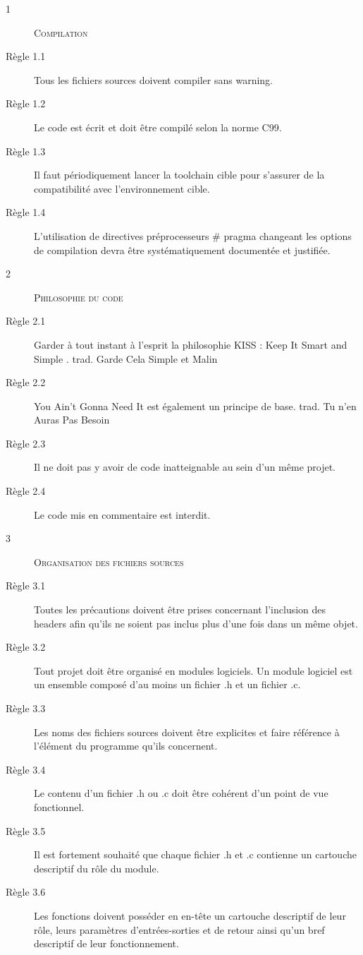 \begin{description}
\item[1] \textsc{Compilation}
\item[Règle 1.1] Tous les fichiers sources doivent compiler sans warning.
\item[Règle 1.2] Le code est écrit et doit être compilé selon la norme C99.
\item[Règle 1.3] Il faut périodiquement lancer la toolchain cible pour s’assurer de la compatibilité avec l’environnement cible.
\item[Règle 1.4] L’utilisation de directives préprocesseurs \# pragma changeant les options de compilation devra être systématiquement documentée et justifiée.

\item[2] \textsc{Philosophie du code}
\item[Règle 2.1] Garder à tout instant à l’esprit la philosophie \og KISS  : Keep It Smart and Simple \fg{}. \linebreak
trad. \og Garde Cela Simple et Malin \fg{}
\item[Règle 2.2] \og You Ain’t Gonna Need It \fg{} est également un principe de base. \linebreak
trad. \og Tu n’en Auras Pas Besoin \fg{}
\item[Règle 2.3] Il ne doit pas y avoir de code inatteignable au sein d’un même projet.
\item[Règle 2.4] Le code mis en commentaire est interdit.

\item[3] \textsc{Organisation des fichiers sources}
\item[Règle 3.1] Toutes les précautions doivent être prises concernant l'inclusion des headers afin qu'ils ne soient pas inclus plus d'une fois dans un même objet.
\item[Règle 3.2] Tout projet doit être organisé en modules logiciels. Un module logiciel est un ensemble composé d’au moins un fichier .h et un fichier .c.
\item[Règle 3.3] Les noms des fichiers sources doivent être explicites et faire référence à l’élément du programme qu’ils concernent.
\item[Règle 3.4] Le contenu d’un fichier .h ou .c doit être cohérent d’un point de vue fonctionnel.
\item[Règle 3.5] Il est fortement souhaité que chaque fichier .h et .c contienne un cartouche descriptif du rôle du module.
\item[Règle 3.6] Les fonctions doivent posséder en en-tête un cartouche descriptif de leur rôle, leurs paramètres d’entrées-sorties et de retour ainsi qu’un bref descriptif de leur fonctionnement.


\end{description}
